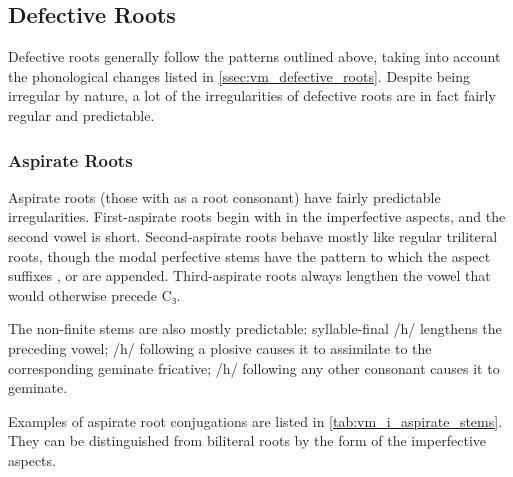 \documentclass[grammar]{subfiles}
\begin{document}
\subsection{Defective Roots}
\label{ssec:vm_i_defective}

Defective roots generally follow the patterns outlined above, taking into
account the phonological changes listed in \cref{ssec:vm_defective_roots}.
Despite being irregular by nature, a lot of the irregularities of defective
roots are in fact fairly regular and predictable. 


\subsubsection{Aspirate Roots}
\label{sssec:vm_i_aspirate}

Aspirate roots (those with  as a root consonant) have fairly predictable
irregularities.  First-aspirate roots begin with  in the imperfective
aspects, and the second vowel is short.  Second-aspirate roots behave mostly like
regular triliteral roots, though the modal perfective stems have the pattern
 to which the aspect suffixes ,  or  are appended.
Third-aspirate roots always lengthen the vowel that would otherwise precede C₃.  

The non-finite stems are also mostly predictable: syllable-final /h/ lengthens the
preceding vowel; /h/ following a plosive causes it to assimilate to the
corresponding geminate fricative; /h/ following any other consonant causes it
to geminate. 

Examples of aspirate root conjugations are listed in
\cref{tab:vm_i_aspirate_stems}.  They can be distinguished from biliteral roots
by the form of the imperfective aspects. 
\end{document}
